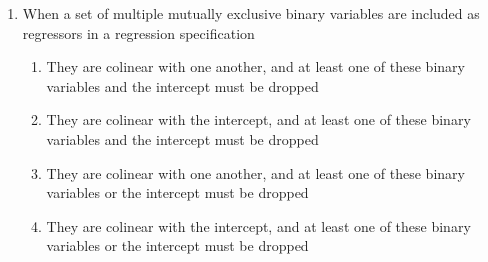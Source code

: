 \documentclass{article}
\begin{document}
\begin{enumerate}
\item  When a set of multiple mutually exclusive binary variables are included as regressors in a regression specification
  \begin{enumerate}[label=\alph*)]
  \item They are colinear with one another, and at least one of these binary variables and the intercept must be dropped  
  \item They are colinear with the intercept, and at least one of these binary variables and the intercept must be dropped  
  \item They are colinear with one another, and at least one of these binary variables or the intercept must be dropped  
  \item They are colinear with the intercept, and at least one of these binary variables or the intercept must be dropped  
  \end{enumerate}\vspace{.25cm}


\end{enumerate}\vspace{.25cm}
\end{document}
